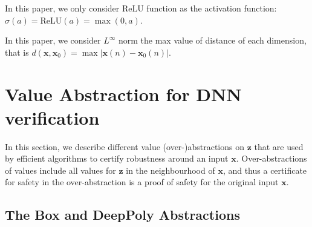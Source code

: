 \documentclass{llncs}
\newcommand{\vx}{\boldsymbol{x}}
\newcommand{\vz}{\boldsymbol{z}}
\newcommand{\ReLU}{\mathrm{ReLU}}
\begin{document}
	In this paper, we only consider $\ReLU$ function as the activation function: $\sigma(a)=\ReLU(a)=\max(0,a)$. 
	
	In this paper, we consider $L^{\infty}$ norm the max value of distance of each dimension, that is $d(\vx,\boldsymbol{x}_0)=\max |\boldsymbol{x}(n)-\boldsymbol{x}_0(n)|$. 
	\fi
	
	
	\section{Value Abstraction for DNN verification}
	
	In this section, we describe different value (over-)abstractions on $\vz$ that are used by efficient algorithms to certify robustness around an input $\vx$. Over-abstractions of values include all values for $\vz$ in the neighbourhood of $\vx$, and thus a certificate for safety in the over-abstraction is a proof of safety for the original input $\vx$.
	
	\subsection{The Box and DeepPoly Abstractions}
	
\end{document}
